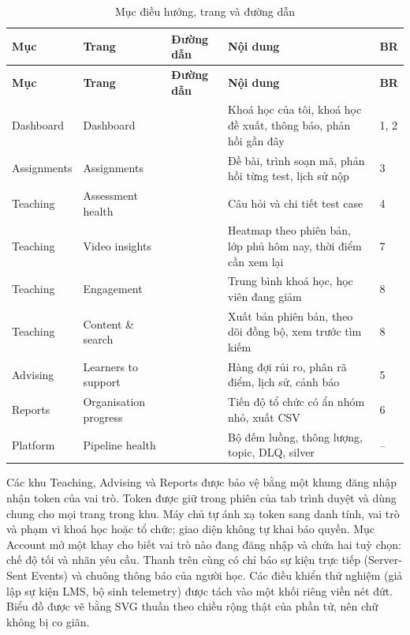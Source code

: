 {\small
\begin{longtable}{@{}L{2.1cm}L{2.4cm}L{5.4cm}L{3.7cm}L{0.6cm}@{}}
\caption{Mục điều hướng, trang và đường dẫn}\label{tab:routes}\\
\toprule
\textbf{Mục} & \textbf{Trang} & \textbf{Đường dẫn} & \textbf{Nội dung} & \textbf{BR} \\
\midrule
\endfirsthead
\toprule
\textbf{Mục} & \textbf{Trang} & \textbf{Đường dẫn} & \textbf{Nội dung} & \textbf{BR} \\
\midrule
\endhead
Dashboard & Dashboard &  & Khoá học của tôi, khoá học đề xuất, thông báo, phản hồi gần đây & 1, 2 \\
Assignments & Assignments &  & Đề bài, trình soạn mã, phản hồi từng test, lịch sử nộp & 3 \\
Teaching & Assessment health &  & Câu hỏi và chi tiết test case & 4 \\
Teaching & Video insights &  & Heatmap theo phiên bản, lớp phủ hôm nay, thời điểm cần xem lại & 7 \\
Teaching & Engagement &  & Trung bình khoá học, học viên đang giảm & 8 \\
Teaching & Content \& search &  & Xuất bản phiên bản, theo dõi đồng bộ, xem trước tìm kiếm & 8 \\
Advising & Learners to support &  & Hàng đợi rủi ro, phân rã điểm, lịch sử, cảnh báo & 5 \\
Reports & Organisation progress &  & Tiến độ tổ chức có ẩn nhóm nhỏ, xuất CSV & 6 \\
Platform & Pipeline health &  & Bộ đếm luồng, thông lượng, topic, DLQ, silver & -- \\
\bottomrule
\end{longtable}}

Các khu Teaching, Advising và Reports được bảo vệ bằng một khung đăng nhập nhận token của vai trò. Token được giữ trong phiên của tab trình duyệt và dùng chung cho mọi trang trong khu. Máy chủ tự ánh xạ token sang danh tính, vai trò và phạm vi khoá học hoặc tổ chức; giao diện không tự khai báo quyền. Mục Account mở một khay cho biết vai trò nào đang đăng nhập và chứa hai tuỳ chọn: chế độ tối và nhãn yêu cầu. Thanh trên cùng có chỉ báo sự kiện trực tiếp (Server-Sent Events) và chuông thông báo của người học. Các điều khiển thử nghiệm (giả lập sự kiện LMS, bộ sinh telemetry) được tách vào một khối riêng viền nét đứt. Biểu đồ được vẽ bằng SVG thuần theo chiều rộng thật của phần tử, nên chữ không bị co giãn.


